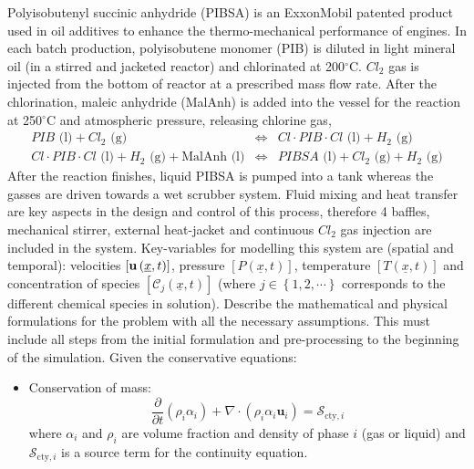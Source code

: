 \documentclass[calculator,datasheet,solutions]{exam}
\newcommand{\frc}{\displaystyle\frac}
\begin{document}
\begin{question}
Polyisobutenyl succinic anhydride (PIBSA) is an ExxonMobil patented product used in oil additives to enhance the thermo-mechanical performance of engines. In each batch production, polyisobutene monomer (PIB) is diluted in light mineral oil (in a stirred and jacketed reactor) and chlorinated at 200$^{\circ}$C. $Cl_{2}$ gas is injected from the bottom of reactor at a prescribed mass flow rate. After the chlorination, maleic anhydride (MalAnh) is added into the vessel for the reaction at 250$^{\circ}$C and atmospheric pressure, releasing chlorine gas,
\begin{eqnarray}
 PIB \text{ (l)} + Cl_{2} \text{ (g)} &\Longleftrightarrow& Cl \cdot PIB \cdot Cl \text{ (l)} + H_{2} \text{ (g)}\nonumber \\
 Cl \cdot PIB \cdot Cl \text{ (l)} + H_{2} \text{ (g)} + \text{MalAnh (l)} &\Longleftrightarrow& PIBSA \text{ (l)} + Cl_{2} \text{ (g)} + H_{2} \text{ (g)} \nonumber 
\end{eqnarray}
After the reaction finishes, liquid PIBSA is pumped into a tank whereas the gasses are driven towards a wet scrubber system. Fluid mixing and heat transfer are key aspects in the design and control of this process, therefore 4 baffles, mechanical stirrer, external heat-jacket and continuous $Cl_{2}$ gas injection are included in the system. Key-variables for modelling this system are (spatial and temporal): velocities $\left[{\bf u}\left(\underline{x},t\right)\right]$, pressure $\left[P\left(\underline{x},t\right)\right]$, temperature $\left[T\left(\underline{x},t\right)\right]$ and concentration of species $\left[\mathcal{C}_{j}\left(\underline{x},t\right)\right]$ (where $j\in\left\{1,2,\cdots\right\}$ corresponds to the different chemical species in solution). Describe the mathematical and physical formulations for the problem with all the necessary assumptions. This must include all steps from the initial formulation and pre-processing to the beginning of the simulation. Given the conservative equations:~
 
\begin{itemize}
\item Conservation of mass:
\begin{displaymath}
\frc{\partial}{\partial t}\left(\rho_{i}\alpha_{i}\right) + \nabla\cdot\left(\rho_{i}\alpha_{i}\mathbf{u}_{i}\right)=\mathcal{S}_{\text{cty},i}
\end{displaymath}
where $\alpha_{i}$ and $\rho_{i}$ are volume fraction and density of phase $i$ (gas or liquid) and $\mathcal{S}_{\text{cty},i}$ is a source term for the continuity equation.


\end{itemize}
\end{question}
\end{document}
